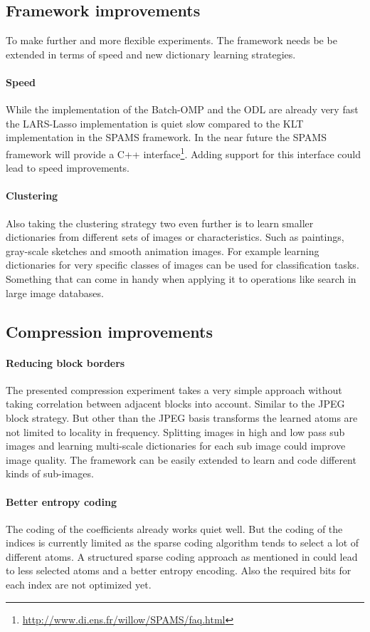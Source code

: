 \subsection{Framework improvements}
To make further and more flexible experiments. The framework needs be be
extended in terms of speed and new dictionary learning strategies.

\paragraph{Speed}
While the implementation of the Batch-OMP and the ODL are already very fast
the LARS-Lasso implementation is quiet slow compared to the KLT implementation
in the SPAMS framework. In the near future the SPAMS framework will provide a
C++ interface\footnote{\url{http://www.di.ens.fr/willow/SPAMS/faq.html}}. Adding
support for this interface could lead to speed improvements. 

\paragraph{Clustering}
Also taking the clustering strategy two even further is to learn smaller
dictionaries from different sets of images or characteristics. Such as
paintings, gray-scale sketches and smooth animation images. For example
learning dictionaries for very specific classes of images can be used for
classification tasks. Something that can come in handy when applying it to
operations like search in large image databases.


\subsection{Compression improvements}
\paragraph{Reducing block borders} The presented compression experiment
takes a very simple approach without taking correlation between adjacent
blocks into account. Similar to the JPEG block strategy. But other than
the JPEG basis transforms the learned atoms are not limited to locality in
frequency. Splitting images in high and low pass sub images and learning
multi-scale dictionaries for each sub image could improve image quality. The
framework can be easily extended to learn and code different kinds of
sub-images.

\paragraph{Better entropy coding}
The coding of the coefficients already works quiet well. But the coding of the
indices is currently limited as the sparse coding algorithm tends to select a
lot of different atoms. A structured sparse coding approach as mentioned in
 could lead to less selected atoms and a better
entropy encoding. Also the required bits for each index are not optimized yet.









